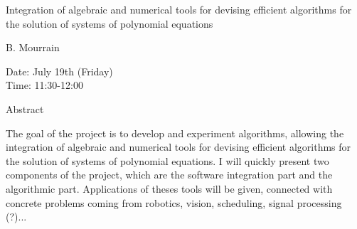 \begin{center}
\LARGE
Integration of algebraic and numerical tools for devising
 efficient algorithms for the solution of systems of polynomial
                            equations

\end{center}

\begin{center}
\Large
B. Mourrain

\end{center}

\noindent
Date:  July 19th (Friday)\\
Time:  11:30-12:00\\

\begin{center}
\large
Abstract
\end{center}

The goal of the project is to develop and experiment algorithms, allowing the integration of
algebraic and numerical tools for devising efficient algorithms for the solution of systems of
polynomial equations. I will quickly present two components of the project, which are the software
integration part and the algorithmic part. Applications of theses tools will be given, connected
with concrete problems coming from robotics, vision, scheduling, signal processing (?)... 

